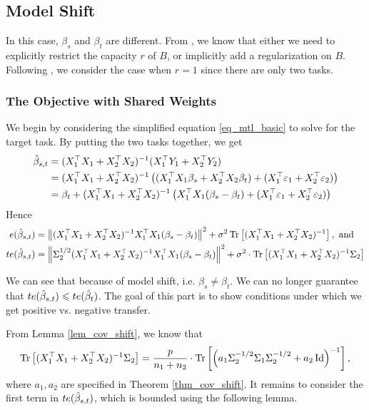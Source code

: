 \subsection{Model Shift}

In this case, $\beta_s$ and $\beta_t$ are different.
From \cite{WZR20}, we know that either we need to explicitly restrict the capacity $r$ of $B$, or implicitly add a regularization on $B$.
Following \cite{WZR20}, we consider the case when $r=1$ since there are only two tasks.

\subsubsection{The Objective with Shared Weights}

We begin by considering the simplified equation \eqref{eq_mtl_basic} to solve for the target task.
By putting the two tasks together, we get
\begin{align*}
	\hat{\beta}_{s,t} &= (X_1^{\top}X_1 + X_2^{\top}X_2)^{-1} (X_1^{\top}Y_1 + X_2^{\top}Y_2) \\
	&= (X_1^{\top}X_1 + X_2^{\top}X_2)^{-1} \left({(X_1^{\top}X_1\beta_s + X_2^{\top}X_2\beta_t) + (X_1^{\top}\varepsilon_1 + X_2^{\top}\varepsilon_2)}\right) \\
	&= \beta_t + (X_1^{\top}X_1 + X_2^{\top}X_2)^{-1}\left({X_1^{\top}X_1(\beta_s - \beta_t) + (X_1^{\top}\varepsilon_1 + X_2^{\top}\varepsilon_2)}\right)
\end{align*}
Hence
\begin{align}
	e(\hat{\beta}_{s,t})
	&= \left\| (X_1^{\top}X_1 + X_2^{\top}X_2)^{-1} X_1^{\top}X_1 (\beta_s - \beta_t) \right\|^2
	+ \sigma^2 \operatorname{Tr}\left[(X_1^{\top}X_1 + X_2^{\top}X_2)^{-1}\right], \text{ and} \\
	te(\hat{\beta}_{s,t})
	&= \left\| \Sigma_2^{1/2} (X_1^{\top}X_1 + X_2^{\top}X_2)^{-1} X_1^{\top}X_1 (\beta_s - \beta_t) \right\|^2 + \sigma^2\cdot \operatorname{Tr}\left[(X_1^{\top}X_1 + X_2^{\top}X_2)^{-1}\Sigma_2\right]
\end{align}

We can see that because of model shift, i.e. $\beta_s \neq \beta_t$.
We can no longer guarantee that $te(\hat{\beta}_{s,t}) \leqslant te(\hat{\beta}_t)$.
The goal of this part is to show conditions under which we get positive vs. negative transfer.

 From Lemma \ref{lem_cov_shift}, we know that
\[ \operatorname{Tr}\left[(X_1^{\top}X_1 + X_2^{\top}X_2)^{-1} \Sigma_2\right] = \frac{p}{n_1 + n_2}\cdot \operatorname{Tr}\left[ \left({a_1\Sigma_2^{-1/2}\Sigma_1\Sigma_2^{-1/2} + a_2\operatorname{Id}}\right)^{-1}\right], \]
where $a_1, a_2$ are specified in Theorem \ref{thm_cov_shift}.
It remains to consider the first term in $te(\hat{\beta}_{s,t})$, which is bounded using the following lemma.

